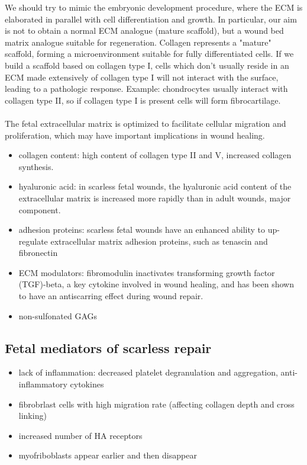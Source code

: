 We should try to mimic the embryonic development procedure, where the ECM is elaborated in parallel with cell differentiation and growth.
In particular, our aim is not to obtain a normal ECM analogue (mature scaffold), but a wound bed matrix analogue suitable for regeneration.
Collagen represents a "mature" scaffold, forming a microenvironment suitable for fully differentiated cells.  If we build a scaffold based on collagen type I, cells which don't usually reside in an ECM made extensively of collagen type I will not interact with the surface, leading to a pathologic response. Example: chondrocytes usually interact with collagen type II, so if collagen type I is present cells will form fibrocartilage.
\\
\\
\noindent
The fetal extracellular matrix is optimized to facilitate cellular migration and proliferation, which may have important implications in wound healing.
\begin{itemize}
\item collagen content: high content of collagen type II and V, increased collagen synthesis.
\item hyaluronic acid: in scarless fetal wounds, the hyaluronic acid content of the extracellular matrix is increased more rapidly than in adult wounds, major component.
\item adhesion proteins: scarless fetal wounds have an enhanced ability to up-regulate extracellular matrix adhesion proteins, such as tenascin and fibronectin
\item ECM modulators: fibromodulin inactivates transforming growth factor (TGF)-beta, a key cytokine involved in wound healing, and has been shown to have an antiscarring effect during wound repair.
\item non-sulfonated GAGs
\end{itemize}

\subsection{Fetal mediators of scarless repair}
\begin{itemize}
\item lack of inflammation: decreased platelet degranulation and aggregation,  anti-inflammatory cytokines
\item fibrobrlast cells with high migration rate (affecting collagen depth and cross linking)
\item increased number of HA receptors
\item myofriboblasts appear earlier and then disappear
\end{itemize}

